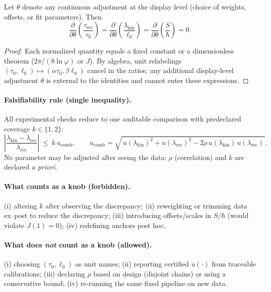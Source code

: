 \documentclass[11pt]{article}
\begin{document}
\begin{lemma}
Let \(\theta\) denote any continuous adjustment at the display level (choice of weights, offsets, or fit parameters). Then
\[
\frac{\partial}{\partial\theta}\left(\frac{\tau_{\mathrm{rec}}}{\tau_{0}}\right)
=
\frac{\partial}{\partial\theta}\left(\frac{\lambda_{\mathrm{kin}}}{\ell_{0}}\right)
=
\frac{\partial}{\partial\theta}\left(\frac{S}{\hbar}\right)
=0.
\]
\end{lemma}

\begin{proof}
Each normalized quantity equals a fixed constant or a dimensionless theorem (\(2\pi/(8\ln\varphi)\) or \(J\)). By algebra, unit relabelings \((\tau_{0},\ell_{0})\mapsto(\alpha\tau_{0},\beta\ell_{0})\) cancel in the ratios; any additional display-level adjustment \(\theta\) is external to the identities and cannot enter these expressions.
\end{proof}

\paragraph{Falsifiability rule (single inequality).}
All experimental checks reduce to one auditable comparison with predeclared coverage \(k\in\{1,2\}\):
\[
\left|\frac{\lambda_{\mathrm{kin}}-\lambda_{\mathrm{rec}}}{\lambda_{\mathrm{rec}}}\right|
\ \le\ 
k\,u_{\mathrm{comb}},
\qquad
u_{\mathrm{comb}}=\sqrt{\,u(\lambda_{\mathrm{kin}})^{2}+u(\lambda_{\mathrm{rec}})^{2}-2\rho\,u(\lambda_{\mathrm{kin}})\,u(\lambda_{\mathrm{rec}})\,}.
\]
No parameter may be adjusted after seeing the data; \(\rho\) (correlation) and \(k\) are declared \emph{a priori}.

\paragraph{What counts as a knob (forbidden).}
(i) altering \(k\) after observing the discrepancy; (ii) reweighting or trimming data ex–post to reduce the discrepancy; (iii) introducing offsets/scales in \(S/\hbar\) (would violate \(J(1)=0\)); (iv) redefining anchors post hoc.

\paragraph{What does \emph{not} count as a knob (allowed).}
(i) choosing \((\tau_{0},\ell_{0})\) as unit names; (ii) reporting certified \(u(\cdot)\) from traceable calibrations; (iii) declaring \(\rho\) based on design (disjoint chains) or using a conservative bound; (iv) re-running the same fixed pipeline on new data.
\end{document}
